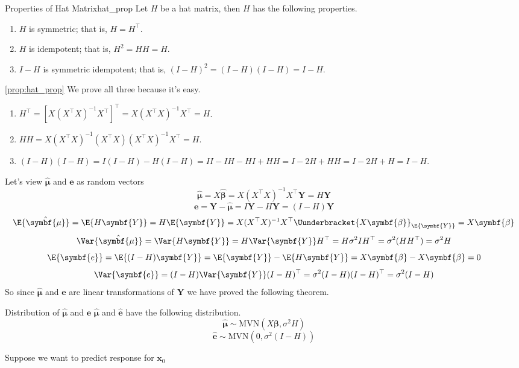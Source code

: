 \begin{Proposition}{Properties of Hat Matrix}{hat_prop}
    Let $ H $ be a hat matrix, then $ H $ has the following properties.
    \begin{enumerate}[label=(\arabic*)]
        \item $ H $ is symmetric; that is, $ H=H^\top $.
        \item $ H $ is idempotent; that is, $ H^2=HH=H $.
        \item $ I-H $ is symmetric idempotent; that is,
              $ (I-H)^2=(I-H)(I-H)=I-H $.
    \end{enumerate}
\end{Proposition}
\begin{Proof}{\ref{prop:hat_prop}}{} We prove all three because it's easy.
    \begin{enumerate}[label=(\arabic*)]
        \item $ H^\top=[X(X^\top X)^{-1}X^\top]^\top=X(X^\top X)^{-1}X^\top=H $.
        \item  $ HH=X(X^\top X)^{-1}(X^\top X)(X^\top X)^{-1}X^\top=H $.
        \item  $ (I-H)(I-H)=I(I-H)-H(I-H)=II-IH-HI+HH=I-2H+HH=I-2H+H=I-H $.
    \end{enumerate}
\end{Proof}
Let's view $ \hat{\symbf{\mu}} $ and $ \symbf{e} $
as random vectors
\[ \hat{\symbf{\mu}}=X\hat{\symbf{\beta}}=
    X(X^\top X)^{-1}X^\top \symbf{Y}=H\symbf{Y} \]
\[ \symbf{e}=\symbf{Y}-\hat{\symbf{\mu}}=I\symbf{Y}-H\symbf{Y}=
    (I-H)\symbf{Y} \]
\[ \E{\hat{\symbf{\mu}}}=\E{H\symbf{Y}}=H\E{\symbf{Y}}=
    X(X^\top X)^{-1}X^\top \Uunderbracket{X\symbf{\beta}}_{\E{\symbf{Y}}}
    =X\symbf{\beta}
\]
\[ \Var{\hat{\symbf{\mu}}}=\Var{H\symbf{Y}}=
    H\Var{\symbf{Y}}H^\top=H\sigma^2I H^\top=\sigma^2(H H^\top)=\sigma^2H \]
\[ \E{ \symbf{e}}=
    \E{(I-H)\symbf{Y}}=\E{\symbf{Y}}-\E{H\symbf{Y}}=X\symbf{\beta}-X\symbf{\beta}=0 \]
\[ \Var{\symbf{e}}=
    (I-H)\Var{\symbf{Y}}(I-H)^\top=\sigma^2(I-H)(I-H)^\top=\sigma^2(I-H) \]
So since $ \hat{\symbf{\mu}} $ and $ \symbf{e} $
are linear transformations of $ \symbf{Y} $ we have proved the following theorem.
\begin{Theorem}{Distribution of $ \hat{\symbf{\mu}} $ and $ \symbf{e} $}{}
    $ \hat{\symbf{\mu}} $ and $ \hat{\symbf{e}} $ have the following distribution.
    \[ \hat{\symbf{\mu}}\sim\text{MVN}(X\symbf{\beta},\sigma^2 H) \]
    \[ \hat{\symbf{e}}\sim\text{MVN}(0,\sigma^2(I-H)) \]
\end{Theorem}
Suppose we want to predict response for $ \symbf{x}_0 $
